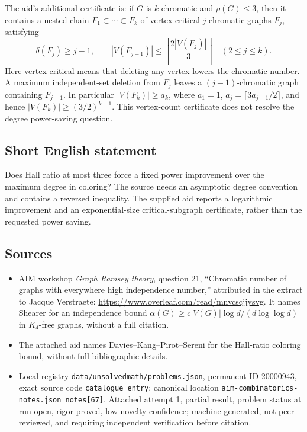 \documentclass[11pt]{article}
\begin{document}
The aid's additional certificate is: if $G$ is $k$-chromatic and $\rho(G)\leq3$, then it contains a nested chain $F_1\subset\cdots\subset F_k$ of vertex-critical $j$-chromatic graphs $F_j$, satisfying
\[
 \delta(F_j)\geq j-1,\qquad
 |V(F_{j-1})|\leq\left\lfloor\frac{2|V(F_j)|}{3}\right\rfloor\quad(2\leq j\leq k).
\]
Here vertex-critical means that deleting any vertex lowers the chromatic number. A maximum independent-set deletion from $F_j$ leaves a $(j-1)$-chromatic graph containing $F_{j-1}$. In particular $|V(F_k)|\geq a_k$, where $a_1=1$, $a_j=\lceil3a_{j-1}/2\rceil$, and hence $|V(F_k)|\geq(3/2)^{k-1}$. This vertex-count certificate does not resolve the degree power-saving question.
\subsection{Short English statement}
Does Hall ratio at most three force a fixed power improvement over the maximum degree in coloring? The source needs an asymptotic degree convention and contains a reversed inequality. The supplied aid reports a logarithmic improvement and an exponential-size critical-subgraph certificate, rather than the requested power saving.
\subsection{Sources}
\begin{itemize}
\item AIM workshop \emph{Graph Ramsey theory}, question 21, ``Chromatic number of graphs with everywhere high independence number,'' attributed in the extract to Jacque Verstraete: \url{https://www.overleaf.com/read/mnvcscjjysvg}. It names Shearer for an independence bound $\alpha(G)\geq c|V(G)|\log d/(d\log\log d)$ in $K_4$-free graphs, without a full citation.
\item The attached aid names Davies--Kang--Pirot--Sereni for the Hall-ratio coloring bound, without full bibliographic details.
\item Local registry \texttt{data/unsolvedmath/problems.json}, permanent ID 20000943, exact source code \texttt{catalogue entry}; canonical location \texttt{aim-combinatorics-notes.json notes[67]}. Attached attempt 1, partial result, problem status at run open, rigor proved, low novelty confidence; machine-generated, not peer reviewed, and requiring independent verification before citation.
\end{itemize}
\end{document}
